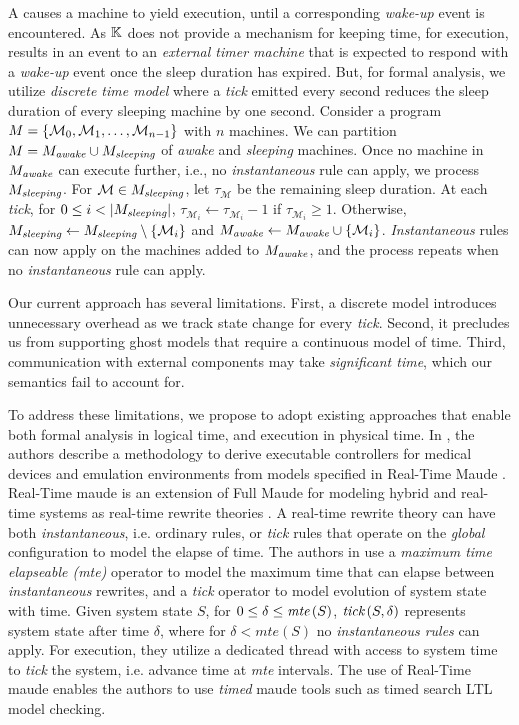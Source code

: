 A  causes a machine to yield execution,
until a corresponding \emph{wake-up} event is encountered.
As $\mathbb{K}{}$ does not provide a mechanism for keeping time,
for execution,  results in an event to an \emph{external
timer machine} that is expected to respond with a
\emph{wake-up} event once the sleep duration has expired.
But, for formal analysis, we utilize \emph{discrete time model} where
a \emph{tick} emitted every second reduces the sleep duration
of every sleeping machine by one second. Consider a program $M = \left\{\mathcal{M}_0,
\mathcal{M}_1, \dots, \mathcal{M}_{n-1}\right\}$ with $n$ machines.
We can partition $M = M_{\textit{awake}} \cup M_{\textit{sleeping}}$ of \emph{awake} and
\emph{sleeping} machines. Once no machine in $M_{\textit{awake}}$ can execute further,
i.e., no \emph{instantaneous} rule can apply, we process $M_{\textit{sleeping}}$.
For $\mathcal{M} \in M_{\textit{sleeping}}$, let $\tau_{\mathcal{M}}$ be the remaining
sleep duration.
At each \emph{tick}, for $0\leq i < |M_{\textit{sleeping}}|$, $\tau_{\mathcal{M}_i} \leftarrow \tau_{\mathcal{M}_i} - 1$
if $\tau_{\mathcal{M}_i} \geq 1$. Otherwise, $M_{\textit{sleeping}} \leftarrow M_{\textit{sleeping}} \setminus \left\{\mathcal{M}_i\right\}$
and $M_{\textit{awake}} \leftarrow M_{\textit{awake}} \cup \left\{\mathcal{M}_i\right\}$.
\emph{Instantaneous} rules can now apply on the machines added to $M_{\textit{awake}}$,
and the process repeats when no \emph{instantaneous} rule can apply.

Our current approach has several limitations. First, a discrete
model introduces unnecessary overhead as we track state change for every
\emph{tick}. Second, it precludes us from supporting
ghost models that require a continuous model of time. Third, communication
with external components may take \emph{significant time}, which our semantics
fail to account for.

To address these limitations, we propose to adopt existing approaches that enable
both formal analysis in logical time, and execution in physical time.
In \cite{SunArxiv10}, the authors describe a methodology to derive
executable controllers for medical devices and emulation environments from
models specified in Real-Time Maude \cite{RealTimeMaudeUrl}. Real-Time maude
is an extension of Full Maude for modeling hybrid and real-time systems as
real-time rewrite theories \cite{RealTimeMaudeManual}.
A real-time rewrite theory can have both \emph{instantaneous}, i.e. ordinary
rules, or \emph{tick} rules that operate on the \emph{global} configuration to
model the elapse of time. The authors in \cite{SunArxiv10} use a \emph{maximum
time elapseable (mte)} operator to model the maximum time that can elapse
between \emph{instantaneous} rewrites, and a \emph{tick} operator to model
evolution of system state with time. Given system state $S$, for $0 \leq \delta
\leq \emph{mte}\left(S\right)$, $\emph{tick}\left(S, \delta\right)$ represents
system state after time $\delta$, where for $\delta < \textit{mte}\left(S\right)$
no \emph{instantaneous rules} can apply.  For execution, they utilize
a dedicated thread with access to system time to \emph{tick} the system, i.e. advance time at \emph{mte} intervals.
The use of Real-Time maude enables the authors to use \emph{timed} maude
tools such as timed search LTL model checking.

